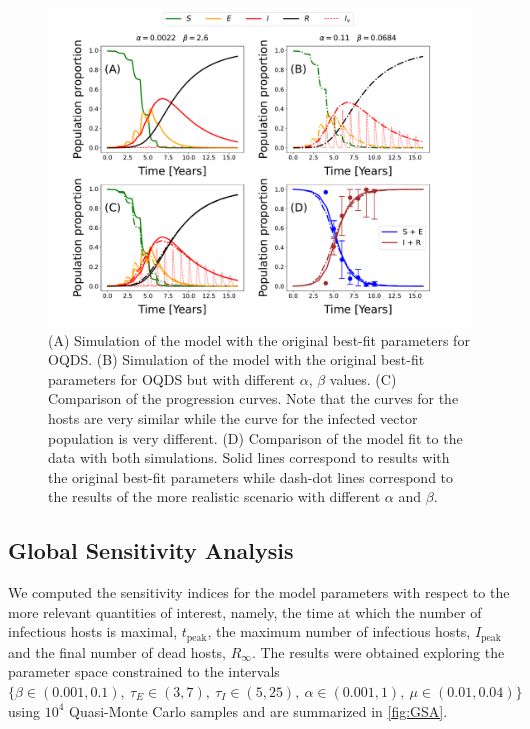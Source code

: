 \begin{figure}[H]
    \centering

    \includegraphics[width=\textwidth]{Figures/OQDS_different_vector_curves_same_host_curve.pdf}
    \caption{(A) Simulation of the model with the original best-fit
        parameters for OQDS. (B) Simulation of the model with the original
        best-fit
        parameters for OQDS but with different $\alpha$, $\beta$ values. (C)
        Comparison
        of the progression curves. Note that the curves for the hosts are very
        similar
        while the curve for the infected vector population is very different.
        (D)
        Comparison of the model fit to the data with both simulations. Solid
        lines
        correspond to results with the original best-fit parameters while
        dash-dot
        lines correspond to the results of the more realistic scenario with
        different
        $\alpha$ and $\beta$.}
    \label{fig:best_fit_model_OQDS}
\end{figure}

\subsection{Global Sensitivity Analysis}

We computed the sensitivity indices for the model parameters with respect
to the more relevant quantities of interest, namely, the time at which the
number of infectious hosts is maximal, $t_{\textrm{peak}}$, the maximum number
of infectious hosts, $I_{\textrm{peak}}$ and the final number of dead hosts,
$R_\infty$. The results were obtained exploring the parameter space constrained
to the intervals $\{\beta\in(0.001, 0.1), \ \tau_E\in(3,7), \ \tau_I\in(5,25),
    \ \alpha\in(0.001, 1), \ \mu\in(0.01, 0.04)\}$ using $10^4$ Quasi-Monte
Carlo
samples and are summarized in \cref{fig:GSA}.

